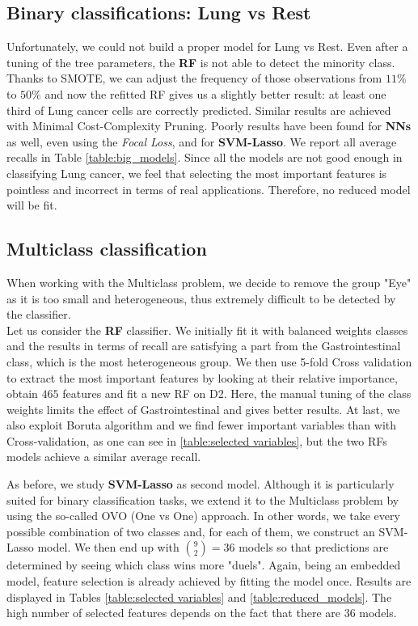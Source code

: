 \documentclass[a4paper,11pt, oneside]{article}  %
\begin{document}
\subsection{Binary classifications: Lung vs Rest}
Unfortunately,  we could not build a proper model for Lung vs Rest.  Even after a tuning of the tree parameters,  the \textbf{RF} is not able to detect the minority class.  Thanks to SMOTE, we can adjust the frequency of those observations from $11\%$ to $50\%$ and now the refitted RF gives us a slightly better result: at least one third of Lung cancer cells are correctly predicted.  Similar results are achieved with Minimal Cost-Complexity Pruning. Poorly results have been found for \textbf{NNs} as well,  even using the \textit{Focal Loss}, and for \textbf{SVM-Lasso}. We report all average recalls in Table \ref{table:big_models}.  Since all the models are not good enough in classifying Lung cancer, we feel that selecting the most important features is pointless and incorrect in terms of real applications. Therefore,  no reduced model will be fit.

\subsection{Multiclass classification}
When working with the Multiclass problem, we decide to remove the group "Eye" as it is too small and heterogeneous,  thus extremely difficult to be detected by the classifier.  \\

Let us consider the \textbf{RF}  classifier. We initially fit it with balanced weights classes and the results in terms of recall are satisfying a part from the Gastrointestinal class,  which is the most heterogeneous group.  We then use 5-fold Cross validation to extract the most important features by looking at their relative importance,  obtain $465$ features and fit a new RF on D2.  Here,  the manual tuning of the class weights limits the effect of Gastrointestinal and gives better results.  At last, we also exploit Boruta algorithm and we find fewer important variables than with Cross-validation,  as one can see in \ref{table:selected variables},  but the two RFs models achieve a similar average recall.

As before, we study \textbf{SVM-Lasso} as second model.  Although it is particularly suited for binary classification tasks, we extend it to the Multiclass problem by using the so-called OVO (One vs One) approach. In other words, we take every possible combination of two classes and, for each of them, we construct an SVM-Lasso model. We then end up with $ \binom{9}{2} = 36$ models so that predictions are determined by seeing which class wins more "duels". Again,  being an embedded model, feature selection is already achieved by fitting the model once.  Results are displayed in Tables \ref{table:selected variables} and \ref{table:reduced_models}. The high number of selected features depends on the fact that there are 36 models.  
\end{document}
